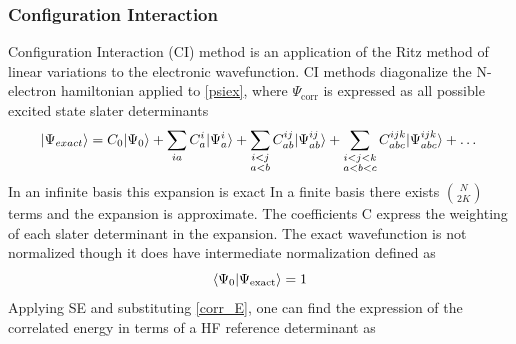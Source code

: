     \subsubsection{Configuration Interaction}
      Configuration Interaction (CI) method is an application of the Ritz method of linear variations to the electronic wavefunction\cite{Shavitt1977,SzaboAttila1982}. CI methods diagonalize the N-electron hamiltonian applied to \cref{psiex}, where $\Psi_{\text{corr}}$ is expressed as all possible excited state slater determinants
        \begin{equation}\label{CI_wfn}
      	  | \Psi_{exact} \rangle = C_0| \Psi_0 \rangle + \sum_{ia} C^i_a | \Psi^i_a \rangle + \sum_{\substack{i<j\\  a<b}} C^{ij}_{ab} | \Psi^{ij}_{ab} \rangle + \sum_{\substack{i<j<k \\ a<b<c}} C_{abc}^{ijk} | \Psi_{abc}^{ijk} \rangle + \dots 
        \end{equation}
      In an infinite basis this expansion is exact
      In a finite basis there exists $\binom{N}{2K}$\cite{SzaboAttila1982} terms and the expansion is approximate. The coefficients C express the weighting of each slater determinant in the expansion. The exact wavefunction is not normalized though it does have intermediate normalization\cite{SzaboAttila1982} defined as 
        \begin{equation}
        \langle\Psi_0|\Psi_{\text{exact}}\rangle = 1
        \end{equation}
      Applying SE and substituting \cref{corr_E}, one can find the expression of the correlated energy in terms of a HF reference determinant as
